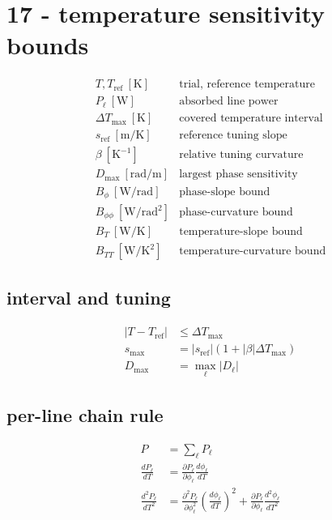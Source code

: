 \section*{17 - temperature sensitivity bounds}

\[
\begin{array}{ll}T,T_{\mathrm{ref}}\ [\mathrm K]&\text{trial, reference temperature}\\[0.6em]P_\ell\ [\mathrm W]&\text{absorbed line power}\\[0.6em]\Delta T_{\max}\ [\mathrm K]&\text{covered temperature interval}\\[0.6em]s_{\mathrm{ref}}\ [\mathrm{m/K}]&\text{reference tuning slope}\\[0.6em]\beta\ [\mathrm{K}^{-1}]&\text{relative tuning curvature}\\[0.6em]D_{\max}\ [\mathrm{rad/m}]&\text{largest phase sensitivity}\\[0.6em]B_\phi\ [\mathrm{W/rad}]&\text{phase-slope bound}\\[0.6em]B_{\phi\phi}\ [\mathrm{W/rad^2}]&\text{phase-curvature bound}\\[0.6em]B_T\ [\mathrm{W/K}]&\text{temperature-slope bound}\\[0.6em]B_{TT}\ [\mathrm{W/K^2}]&\text{temperature-curvature bound}\end{array}
\]

\subsection*{interval and tuning}
\[
\displaystyle \begin{aligned}|T-T_{\mathrm{ref}}|&\le\Delta T_{\max}\\s_{\max}&=|s_{\mathrm{ref}}|(1+|\beta|\Delta T_{\max})\\D_{\max}&=\max_\ell|D_\ell|\end{aligned}
\]

\subsection*{per-line chain rule}
\[
\displaystyle \begin{aligned}P&=\sum_\ell P_\ell\\\frac{dP_\ell}{dT}&=\frac{\partial P_\ell}{\partial\phi_\ell}\frac{d\phi_\ell}{dT}\\\frac{d^2P_\ell}{dT^2}&=\frac{\partial^2P_\ell}{\partial\phi_\ell^2}\left(\frac{d\phi_\ell}{dT}\right)^2+\frac{\partial P_\ell}{\partial\phi_\ell}\frac{d^2\phi_\ell}{dT^2}\end{aligned}
\]

